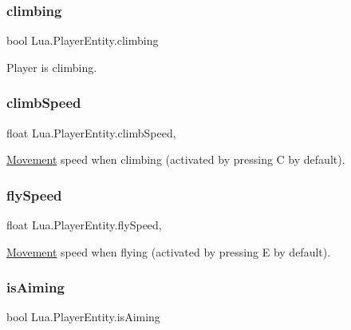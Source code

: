 \subsubsection{\texorpdfstring{climbing}{climbing}}
{\footnotesize\ttfamily bool Lua.\+Player\+Entity.\+climbing\hspace{0.3cm}{\ttfamily [get]}}



Player is climbing. 

\mbox{\label{class_lua_1_1_player_entity_a6917cc802f4f2de29b01e7c968b6336e}} 
\subsubsection{\texorpdfstring{climbSpeed}{climbSpeed}}
{\footnotesize\ttfamily float Lua.\+Player\+Entity.\+climb\+Speed\hspace{0.3cm}{\ttfamily [get]}, {\ttfamily [set]}}



\mbox{\hyperlink{class_lua_1_1_movement}{Movement}} speed when climbing (activated by pressing {\ttfamily C} by default). 

\mbox{\label{class_lua_1_1_player_entity_a07be3c99f61960cadd5333939bc9ee88}} 
\subsubsection{\texorpdfstring{flySpeed}{flySpeed}}
{\footnotesize\ttfamily float Lua.\+Player\+Entity.\+fly\+Speed\hspace{0.3cm}{\ttfamily [get]}, {\ttfamily [set]}}



\mbox{\hyperlink{class_lua_1_1_movement}{Movement}} speed when flying (activated by pressing {\ttfamily E} by default). 

\mbox{\label{class_lua_1_1_player_entity_ae805d9b6fbe0ecb483f726fee471434f}} 
\subsubsection{\texorpdfstring{isAiming}{isAiming}}
{\footnotesize\ttfamily bool Lua.\+Player\+Entity.\+is\+Aiming\hspace{0.3cm}{\ttfamily [get]}}



